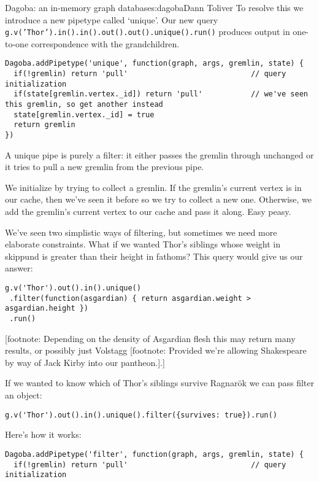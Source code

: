 \begin{aosachapter}{Dagoba: an in-memory graph database}{s:dagoba}{Dann Toliver}
To resolve this we introduce a new pipetype called `unique'. Our new
query \texttt{g.v('Thor').in().in().out().out().unique().run()} produces
output in one-to-one correspondence with the grandchildren.

\begin{verbatim}
Dagoba.addPipetype('unique', function(graph, args, gremlin, state) {
  if(!gremlin) return 'pull'                            // query initialization
  if(state[gremlin.vertex._id]) return 'pull'           // we've seen this gremlin, so get another instead
  state[gremlin.vertex._id] = true
  return gremlin
})
\end{verbatim}

A unique pipe is purely a filter: it either passes the gremlin through
unchanged or it tries to pull a new gremlin from the previous pipe.

We initialize by trying to collect a gremlin. If the gremlin's current
vertex is in our cache, then we've seen it before so we try to collect a
new one. Otherwise, we add the gremlin's current vertex to our cache and
pass it along. Easy peasy.

\label{filter}

We've seen two simplistic ways of filtering, but sometimes we need more
elaborate constraints. What if we wanted Thor's siblings whose weight in
skippund is greater than their height in fathoms? This query would give
us our answer:

\begin{verbatim}
g.v('Thor').out().in().unique()
 .filter(function(asgardian) { return asgardian.weight > asgardian.height })
 .run()
\end{verbatim}

{[}footnote: Depending on the density of Asgardian flesh this may return
many results, or possibly just Volstagg {[}footnote: Provided we're
allowing Shakespeare by way of Jack Kirby into our pantheon.{]}.{]}

If we wanted to know which of Thor's siblings survive Ragnarök we can
pass filter an object:

\begin{verbatim}
g.v('Thor').out().in().unique().filter({survives: true}).run()
\end{verbatim}

Here's how it works:

\begin{verbatim}
Dagoba.addPipetype('filter', function(graph, args, gremlin, state) {
  if(!gremlin) return 'pull'                            // query initialization


\end{verbatim}
\end{aosachapter}
